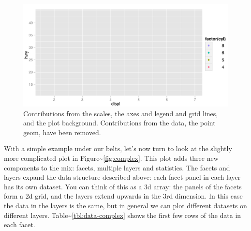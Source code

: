 \begin{figure}[htbp]
  \centering
  \includegraphics[width=0.8\linewidth]{diagrams/empty}
  \caption{Contributions from the scales, the axes and legend and grid lines, and the plot background.  Contributions from the data, the point geom, have been removed.}
  \label{fig:empty}
\end{figure}


With a simple example under our belts, let's now turn to look at the
slightly more complicated plot in
Figure\textasciitilde{}\ref{fig:complex}. This plot adds three new
components to the mix: facets, multiple layers and statistics. The
facets and layers expand the data structure described above: each facet
panel in each layer has its own dataset. You can think of this as a 3d
array: the panels of the facets form a 2d grid, and the layers extend
upwards in the 3rd dimension. In this case the data in the layers is the
same, but in general we can plot different datasets on different layers.
Table\textasciitilde{}\ref{tbl:data-complex} shows the first few rows of
the data in each facet.

\begin{Shaded}
\begin{Highlighting}[]
 \StringTok{ }\StringTok{ }\NormalTok{()}
\end{Highlighting}
\end{Shaded}

